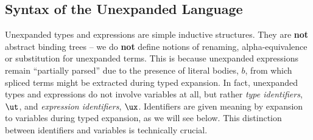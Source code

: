 \documentclass[acmlarge,review,anonymous]{acmart}\settopmatter{printfolios=true}
\begin{document}
\subsection{Syntax of the Unexpanded Language}\label{sec:syntax-U}
Unexpanded types and expressions are simple inductive structures. They are \textbf{not} abstract binding trees -- we do \textbf{not} define notions of renaming, alpha-equivalence or substitution for unexpanded terms. This is because unexpanded expressions remain ``partially parsed'' due to the presence of literal bodies, $b$, from which spliced terms might be extracted during typed expansion. In fact, unexpanded types and expressions do not involve variables at all, but rather \emph{type identifiers}, $\ut$, and \emph{expression identifiers}, $\ux$. Identifiers are given meaning by expansion to variables during typed expansion, as we will see below. This distinction between identifiers and variables is technically crucial. %

\end{document}
